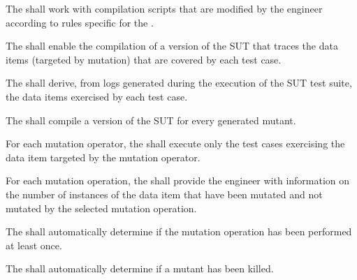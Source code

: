 




\RQ{} The \FAQAS shall work with compilation scripts that are modified by the engineer according to rules specific for the \FAQAS.

\RQ{} The \FAQAS shall enable the compilation of a version of the SUT that traces the data items (targeted by mutation) that are covered by each test case.

\RQ{} The \FAQAS shall derive, from logs generated during the execution of the SUT test suite, the data items exercised by each test case.


\RQ{} The \FAQAS shall compile a version of the SUT for every generated mutant.

\RQ{} For each mutation operator, the \FAQAS shall execute only the test cases exercising the data item targeted by the mutation operator.



\RQ{} For each mutation operation, the \FAQAS shall provide the engineer with information on the number of instances of the data item that have been mutated and not mutated by the selected mutation operation.

\RQ{} The \FAQAS shall automatically determine if the mutation operation has been performed at least once.

\RQ{} The \FAQAS shall automatically determine if a mutant has been killed.


